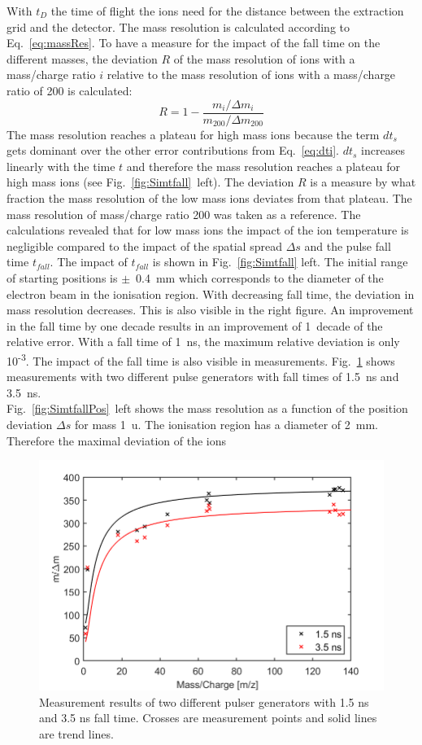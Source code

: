 	With $t_{D}$ the time of flight the ions need for the distance between the extraction grid and the detector. The mass resolution is calculated according to Eq.~\eqref{eq:massRes}. To have a measure for the impact of the fall time on the different masses, the deviation $R$ of the mass resolution of ions with a mass/charge ratio $i$ relative to the mass resolution of ions with a mass/charge ratio of 200 is calculated:
	\begin{equation}
		R = 1 - \frac{m_i/\Delta m_i}{m_{200}/\Delta m_{200}}
	\end{equation}
	The mass resolution reaches a plateau for high mass ions because the term $dt_s$ gets dominant over the other error contributions from Eq.~\eqref{eq:dti}. $dt_s$ increases linearly with the time $t$ and therefore the mass resolution reaches a plateau for high mass ions (see Fig.~\ref{fig:Simtfall}~left). The deviation $R$ is a measure by what fraction the mass resolution of the low mass ions deviates from that plateau. The mass resolution of mass/charge ratio 200 was taken as a reference. The calculations revealed that for low mass ions the impact of the ion temperature is negligible compared to the impact of the spatial spread $\Delta s$ and the pulse fall time $t_{fall}$. The impact of $t_{fall}$ is shown in Fig.~\ref{fig:Simtfall} left. The initial range of starting positions is $\pm$~0.4~mm which corresponds to the diameter of the electron beam in the ionisation region. With decreasing fall time, the deviation in mass resolution decreases. This is also visible in the right figure. An improvement in the fall time by one decade results in an improvement of 1~decade of the relative error. With a fall time of 1~ns, the maximum relative deviation is only 10\textsuperscript{-3}. The impact of the fall time is also visible in measurements. Fig.~\ref{fig:LabWLE} shows measurements with two different pulse generators with fall times of 1.5~ns and 3.5~ns.\\
	Fig.~\ref{fig:SimtfallPos}~left shows the mass resolution as a function of the position deviation $\Delta s$ for mass 1~u. The ionisation region has a diameter of 2~mm. Therefore the maximal deviation of the ions 
	\begin{figure}[H] %
		\centering
		\includegraphics[width=.8\textwidth]{Bilder/PulseLabWLEm480.png}
		\caption{Measurement results of two different pulser generators with 1.5 ns and 3.5 ns fall time. Crosses are measurement points and solid lines are trend lines.}
		\label{fig:LabWLE}
	\end{figure}
